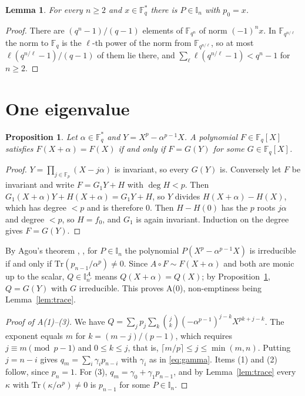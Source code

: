\documentclass[11pt,a4paper]{amsart}
\newtheorem{lemma}[theorem]{Lemma}
\newtheorem{proposition}[theorem]{Proposition}
\theoremstyle{remark}
\newcommand{\F}{\mathbb{F}}
\newcommand{\Fq}{\mathbb{F}_q}
\newcommand{\Tr}{\mathrm{Tr}}
\newcommand{\I}{\mathbb{I}}
\begin{document}
\begin{lemma}\label{lem:norm}
For every $n\ge2$ and $x\in\Fq^*$ there is $P\in\I_n$ with $p_0=x$.
\end{lemma}
\begin{proof}
There are $(q^n-1)/(q-1)$ elements of $\F_{q^n}$ of norm $(-1)^nx$. In $\F_{q^{n/\ell}}$ the norm to $\Fq$ is
the $\ell$-th power of the norm from $\F_{q^{n/\ell}}$, so at most $\ell(q^{n/\ell}-1)/(q-1)$ of them lie there,
and $\sum_\ell\ell(q^{n/\ell}-1)<q^n-1$ for $n\ge2$.
\end{proof}

\section{One eigenvalue}\label{sec:one}

\begin{proposition}\label{prop:periodic}
Let $\alpha\in\Fq^*$ and $Y=X^p-\alpha^{p-1}X$. A polynomial $F\in\Fq[X]$ satisfies $F(X+\alpha)=F(X)$ if and only
if $F=G(Y)$ for some $G\in\Fq[X]$.
\end{proposition}
\begin{proof}
$Y=\prod_{j\in\F_p}(X-j\alpha)$ is invariant, so every $G(Y)$ is. Conversely let $F$ be invariant and write
$F=G_1Y+H$ with $\deg H<p$. Then $G_1(X+\alpha)Y+H(X+\alpha)=G_1Y+H$, so $Y$ divides $H(X+\alpha)-H(X)$, which
has degree $<p$ and is therefore $0$. Then $H-H(0)$ has the $p$ roots $j\alpha$ and degree $<p$, so $H=f_0$,
and $G_1$ is again invariant. Induction on the degree gives $F=G(Y)$.
\end{proof}

By Agou's theorem \cite{Ag}, \cite[Theorem~2.2]{K}, for $P\in\I_n$ the polynomial $P(X^p-\alpha^{p-1}X)$ is
irreducible if and only if $\Tr(p_{n-1}/\alpha^p)\ne0$. Since $A\circ F\sim F(X+\alpha)$ and both are monic up to
the scalar, $Q\in\I^A_{n'}$ means $Q(X+\alpha)=Q(X)$; by Proposition~\ref{prop:periodic}, $Q=G(Y)$ with $G$
irreducible. This proves A(0), non-emptiness being Lemma~\ref{lem:trace}.

\begin{proof}[Proof of A(1)--(3)]
We have $Q=\sum_j p_j\sum_k\binom jk(-\alpha^{p-1})^{j-k}X^{pk+j-k}$. The exponent equals $m$ for
$k=(m-j)/(p-1)$, which requires $j\equiv m\pmod{p-1}$ and $0\le k\le j$, that is, $\lceil m/p\rceil\le j\le
\min(m,n)$. Putting $j=n-i$ gives $q_m=\sum_i\gamma_ip_{n-i}$ with $\gamma_i$ as in \eqref{eq:gamma}. Items (1)
and (2) follow, since $p_n=1$. For (3), $q_m=\gamma_0+\gamma_1p_{n-1}$, and by Lemma~\ref{lem:trace} every
$\kappa$ with $\Tr(\kappa/\alpha^p)\ne0$ is $p_{n-1}$ for some $P\in\I_n$.
\end{proof}
\end{document}
